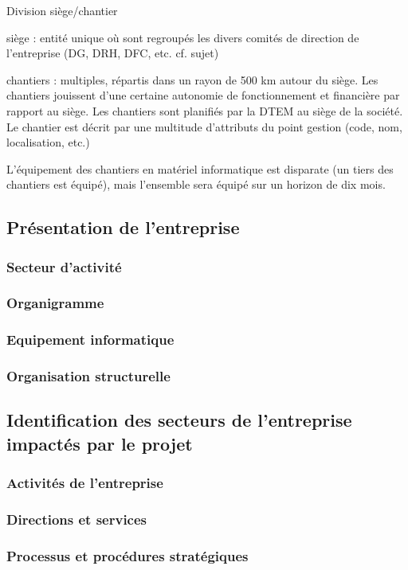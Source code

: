 Division siège/chantier

siège : entité unique où sont regroupés les divers comités de direction de l'entreprise (DG, DRH, DFC, etc. cf. sujet)

chantiers : multiples, répartis dans un rayon de 500 km autour du siège. Les chantiers jouissent d'une certaine autonomie de fonctionnement et financière par rapport au siège. Les chantiers sont planifiés par la DTEM au siège de la société. Le chantier est décrit par une multitude d'attributs du point gestion (code, nom, localisation, etc.)

L'équipement des chantiers en matériel informatique est disparate (un tiers des chantiers est équipé), mais l'ensemble sera équipé sur un horizon de dix mois. 

\subsection{Présentation de l'entreprise}

\subsubsection{Secteur d'activité}
\subsubsection{Organigramme}
\subsubsection{Equipement informatique}
\subsubsection{Organisation structurelle}


\subsection{Identification des secteurs de l'entreprise impactés par le projet}

\subsubsection{Activités de l'entreprise}
\subsubsection{Directions et services}
\subsubsection{Processus et procédures stratégiques}
